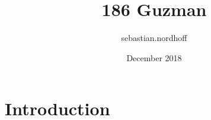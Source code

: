 \documentclass{article}
\title{186 Guzman}
\author{sebastian.nordhoff }
\date{December 2018}
\begin{document}
\maketitle

\section{Introduction}
\end{document}
